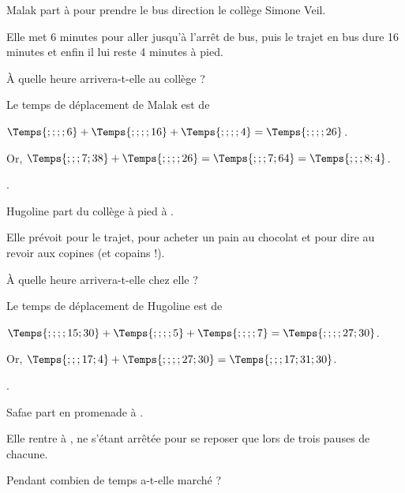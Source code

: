 \begin{Maquette}[Fiche,CorrigeFin,Colonnes=2]{}

   \begin{multicols}{2}

      \begin{exercice} %
         Malak part à  pour prendre le bus direction le collège Simone Veil. \par
         Elle met 6 minutes pour aller jusqu'à l'arrêt de bus, puis le trajet en bus dure 16 minutes et enfin il lui reste 4 minutes à pied. \par
         À quelle heure arrivera-t-elle au collège ?
      \end{exercice}
      
      \begin{Solution}
         Le temps de déplacement de Malak est de \par
         $\Temps{;;;;6}+\Temps{;;;;16}+\Temps{;;;;4} =\Temps{;;;;26}$. \par
         Or, $\Temps{;;;7;38}+\Temps{;;;;26} =\Temps{;;;7;64} =\Temps{;;;8;4}$. \par
         .
      \end{Solution}

      
      \begin{exercice} %
         Hugoline part du collège à pied à . \par
         Elle prévoit  pour le trajet,  pour acheter un pain au chocolat et  pour dire au revoir aux copines (et copains !). \par
         À quelle heure arrivera-t-elle chez elle ?
      \end{exercice}
      
      \begin{Solution}
         Le temps de déplacement de Hugoline est de \par
         $\Temps{;;;;15;30}+\Temps{;;;;5}+\Temps{;;;;7} =\Temps{;;;;27;30}$. \par
         Or, $\Temps{;;;17;4}+\Temps{;;;;27;30} =\Temps{;;;17;31;30}$. \par
         .
      \end{Solution}
      
      
      \begin{exercice} %
         Safae part en promenade à . \par
         Elle rentre à , ne s'étant arrêtée pour se reposer que lors de trois pauses de  chacune. \par
         Pendant combien de temps a-t-elle marché ?
      \end{exercice}
      

\end{multicols}
\end{Maquette}
